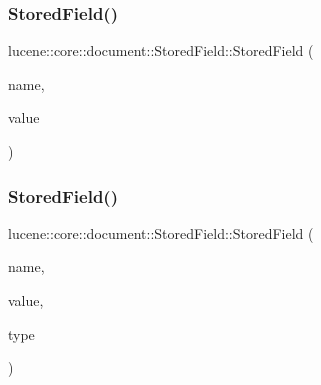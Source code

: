 \mbox{\label{classlucene_1_1core_1_1document_1_1StoredField_af384294458d9e224ff6a056188513245}} 
\subsubsection{\texorpdfstring{Stored\+Field()}{StoredField()}\hspace{0.1cm}{\footnotesize\ttfamily [10/15]}}
{\footnotesize\ttfamily lucene\+::core\+::document\+::\+Stored\+Field\+::\+Stored\+Field (\begin{DoxyParamCaption}\item[{\mbox{\hyperlink{ZlibCrc32_8h_a2c212835823e3c54a8ab6d95c652660e}{const}} std\+::string \&}]{name,  }\item[{std\+::string \&\&}]{value }\end{DoxyParamCaption})\hspace{0.3cm}{\ttfamily [inline]}}

\mbox{\label{classlucene_1_1core_1_1document_1_1StoredField_a334a4af15ae22b1036fb2b799e7f2f7d}} 
\subsubsection{\texorpdfstring{Stored\+Field()}{StoredField()}\hspace{0.1cm}{\footnotesize\ttfamily [11/15]}}
{\footnotesize\ttfamily lucene\+::core\+::document\+::\+Stored\+Field\+::\+Stored\+Field (\begin{DoxyParamCaption}\item[{\mbox{\hyperlink{ZlibCrc32_8h_a2c212835823e3c54a8ab6d95c652660e}{const}} std\+::string \&}]{name,  }\item[{\mbox{\hyperlink{ZlibCrc32_8h_a2c212835823e3c54a8ab6d95c652660e}{const}} std\+::string \&}]{value,  }\item[{\mbox{\hyperlink{ZlibCrc32_8h_a2c212835823e3c54a8ab6d95c652660e}{const}} \mbox{\hyperlink{classlucene_1_1core_1_1document_1_1FieldType}{Field\+Type}} \&}]{type }\end{DoxyParamCaption})\hspace{0.3cm}{\ttfamily [inline]}}

